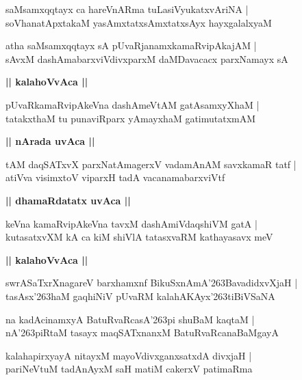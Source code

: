 \documentclass[twoside,12pt,openright]{book}
\def\S{\char'263}
\newcounter{shloka}[chapter]
\def\uvaca#1{\centerline{{\large\textbf{#1}}}}
\begin{document}
\begin{shloka}%
saMsamxqqtayx ca hareVnARma tuLasiVyukatxvAriNA |\\
soVhanatApxtakaM yasAmxtatxsAmxtatxsAyx hayxgalalxyaM 
\end{shloka}

\begin{shloka}%
atha saMsamxqqtayx sA pUvaRjanamxkamaRvipAkajAM |\\
sAvxM dashAmabarxviVdivxparxM daMDavacacx parxNamayx sA 
\end{shloka}

\uvaca{|| kalahoVvAca ||}

\begin{shloka}%
pUvaRkamaRvipAkeVna dashAmeVtAM gatAsamxyXhaM |\\
tatakxthaM tu punaviRparx yAmayxhaM gatimutatxmAM 
\end{shloka}

\uvaca{|| nArada uvAca ||}

\begin{shloka}%
tAM daqSATxvX parxNatAmagerxV vadamAnAM savxkamaR tatf |\\
atiVva visimxtoV viparxH tadA vacanamabarxviVtf
\end{shloka}

\uvaca{|| dhamaRdatatx uvAca ||}

\begin{shloka}%
keVna kamaRvipAkeVna tavxM dashAmiVdaqshiVM gatA |\\
kutasatxvXM kA ca kiM shiVlA tatasxvaRM kathayasavx meV 
\end{shloka}

\uvaca{|| kalahoVvAca ||}

\begin{shloka}%
swrASaTxrXnagareV barxhamxnf BikuSxnAmA\S BavadidxvXjaH |\\
tasAsx\S haM gaqhiNiV pUvaRM kalahAKAyx\S tiBiVSaNA 
\end{shloka}

\begin{shloka}%
na kadAcinamxyA BatuRvaRcasA\S pi shuBaM kaqtaM |\\
nA\S piRtaM tasayx maqSATxnanxM BatuRvaRcanaBaMgayA 
\end{shloka}

\begin{shloka}%
kalahapirxyayA nitayxM mayoVdivxganxsatxdA divxjaH |\\
pariNeVtuM tadAnAyxM saH matiM cakerxV patimaRma
\end{shloka}
\end{document}
